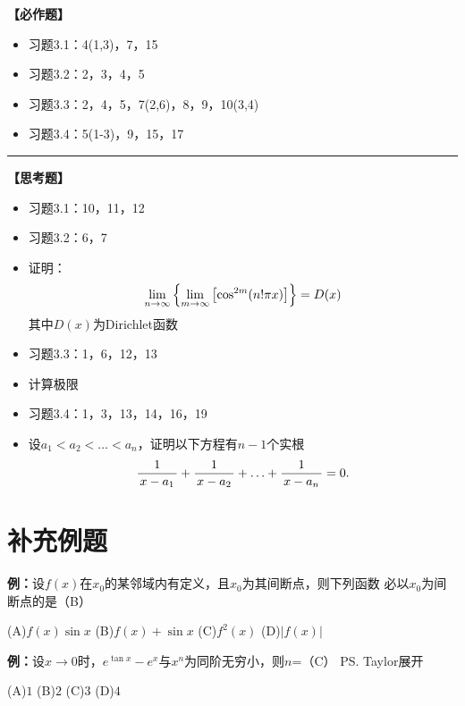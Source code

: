{\bf 【必作题】}

\begin{itemize}
  \item 习题3.1：4(1,3)，7，15
  \item 习题3.2：2，3，4，5
  \item 习题3.3：2，4，5，7(2,6)，8，9，10(3,4)
  \item 习题3.4：5(1-3)，9，15，17
\end{itemize}

\bigskip

\hrule

\bigskip
\bigskip

{\bf 【思考题】}
\begin{itemize}
  \item 习题3.1：10，11，12
  \item 习题3.2：6，7
  \item 证明：$$\lim\limits_{n\to\infty}\left\{\lim\limits_{m\to\infty}\left[\cos^{2m}(n!\pi
	x)\right]\right\}=D(x)$$
	其中$D(x)$为Dirichlet函数
  \item 习题3.3：1，6，12，13
  \item  计算极限
  \item 习题3.4：1，3，13，14，16，19
  \item 设$a_1<a_2<\ldots<a_n$，证明以下方程有$n-1$个实根
	$$\displaystyle\frac{\,{1}\,}{\,{x-a_1}\,}+\displaystyle\frac{\,{1}\,}{\,{x-a_2}\,}+\ldots+\displaystyle\frac{\,{1}\,}{\,{x-a_n}\,}=0.$$
\end{itemize}

\newpage

\section*{补充例题}



{\bf 例：}设$f(x)$在$x_0$的某邻域内有定义，且$x_0$为其间断点，则下列函数
必以$x_0$为间断点的是（B）

\quad
(A)\;$f(x)\sin x$\hspace{2cm}
(B)\;$f(x)+\sin x$\hspace{2cm}
(C)\;$f^2(x)$\hspace{2cm}
(D)\;$|f(x)|$ 

{\bf 例：}设$x\to 0$时，$e^{\tan x}-e^x$与$x^n$为同阶无穷小，则$n$=（C）
\ps{Taylor展开}

\quad
(A)\;$1$\hspace{2cm}
(B)\;$2$\hspace{2cm}
(C)\;$3$\hspace{2cm}
(D)\;$4$ 

